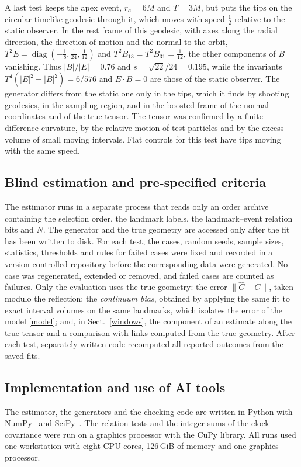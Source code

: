 \documentclass[11pt,a4paper]{article}
\begin{document}
A last test keeps the apex event, $r_a=6M$ and $T=3M$, but puts the tips on
the circular timelike geodesic through it, which moves with speed
$\tfrac12$ relative to the static observer. In the rest frame of this
geodesic, with axes along the radial direction, the direction of motion and
the normal to the orbit,
$T^2E=\operatorname{diag}(-\tfrac18,\tfrac1{24},\tfrac1{12})$ and
$T^2B_{13}=T^2B_{31}=\tfrac1{12}$, the other components of $B$ vanishing.
Thus $|B|/|E|=0.76$ and $s=\sqrt{22}/24=0.195$, while the invariants
$T^4(|E|^2-|B|^2)=6/576$ and $E\cdot B=0$ are those of the static observer.
The generator differs from the static one only in the tips, which it finds
by shooting geodesics, in the sampling region, and in the boosted frame of
the normal coordinates and of the true tensor. The tensor was confirmed by a
finite-difference curvature, by the relative motion of test particles and by
the excess volume of small moving intervals. Flat controls for this test have
tips moving with the same speed.

\subsection{Blind estimation and pre-specified criteria}\label{procedure}
The estimator runs in a separate process that reads only an order archive
containing the selection order, the landmark labels, the landmark--event
relation bits and $N$. The generator and the true geometry are accessed only
after the fit has been written to disk. For each test, the cases, random
seeds, sample sizes, statistics, thresholds and rules for failed cases were
fixed and recorded in a version-controlled repository before the
corresponding data were generated. No case was regenerated, extended or
removed, and failed cases are counted as failures. Only the evaluation
uses the true geometry: the error $\|\widehat C-C\|$, taken modulo the
reflection; the \emph{continuum bias}, obtained by applying the same fit to
exact interval volumes on the same landmarks, which isolates the error of
the model \eqref{model}; and, in Sect.~\ref{windows}, the component of an
estimate along the true tensor and a comparison with links computed from the
true geometry. After each test, separately written code recomputed all
reported outcomes from the saved fits.

\subsection{Implementation and use of AI tools}\label{implementation}
The estimator, the generators and the checking code are written in Python
with NumPy~\cite{numpy} and SciPy~\cite{scipy}. The relation tests and the
integer sums of the clock covariance were run on a graphics processor with
the CuPy library. All runs used one workstation with eight CPU cores,
126\,GiB of memory and one graphics processor.
\end{document}
